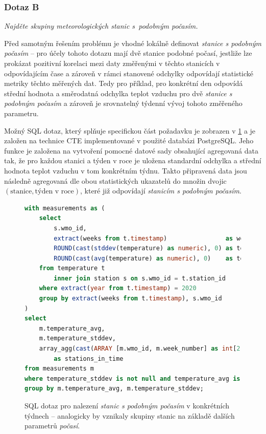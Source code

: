 \documentclass[10pt,a4paper,titlepage]{extarticle}
\begin{document}
    \subsubsection{Dotaz B}
    \emph{Najděte skupiny meteorologických stanic s~podobným počasím.}

    Před samotným řešením problému je vhodné lokálně definovat \emph{stanice s podobným počasím} -- pro účely tohoto
    dotazu mají dvě stanice podobné počasí, jestliže lze prokázat pozitivní korelaci mezi daty změřenými v těchto
    stanicích v odpovídajícím čase a zároveň v rámci stanovené odchylky odpovídají statistické metriky těchto
    měřených dat. Tedy pro příklad, pro konkrétní den odpovídá střední hodnota a směrodatná odchylka teplot vzduchu
    pro dvě \emph{stanice s podobným počasím} a zároveň je srovnatelný týdenní vývoj tohoto změřeného parametru.

    Možný SQL dotaz, který splňuje specifickou část požadavku je zobrazen v \ref{lst:sql-dotaz-b} a je založen na
    technice CTE implementované v použité databázi PostgreSQL. Jeho funkce je založena na vytvoření pomocné datové
    sady obsahující agregovaná data tak, že pro každou stanici a týden v roce je uložena standardní odchylka a
    střední hodnota teplot vzduchu v tom konkrétním týdnu. Takto připravená data jsou následně agregovaná dle obou
    statistických ukazatelů do množin dvojic $(\text{stanice}, \text{týden v roce})$, které již odpovídají
    \emph{stanicím s podobným počasím}.
\begin{figure}[H]
    \begin{lstlisting}[language=SQL]
with measurements as (
    select
        s.wmo_id,
        extract(weeks from t.timestamp)                as week_number,
        ROUND(cast(stddev(temperature) as numeric), 0) as temperature_stddev,
        ROUND(cast(avg(temperature) as numeric), 0)    as temperature_avg
    from temperature t
        inner join station s on s.wmo_id = t.station_id
    where extract(year from t.timestamp) = 2020
    group by extract(weeks from t.timestamp), s.wmo_id
)
select
    m.temperature_avg,
    m.temperature_stddev,
    array_agg(cast(ARRAY [m.wmo_id, m.week_number] as int[2]))
        as stations_in_time
from measurements m
where temperature_stddev is not null and temperature_avg is not null
group by m.temperature_avg, m.temperature_stddev;
    \end{lstlisting}
    \caption{SQL dotaz pro nalezení \emph{stanic s podobným počasím} v konkrétních týdnech -- analogicky by vznikaly
    skupiny stanic na základě dalších parametrů \emph{počasí}.}
    \label{lst:sql-dotaz-b}
\end{figure}
\end{document}
